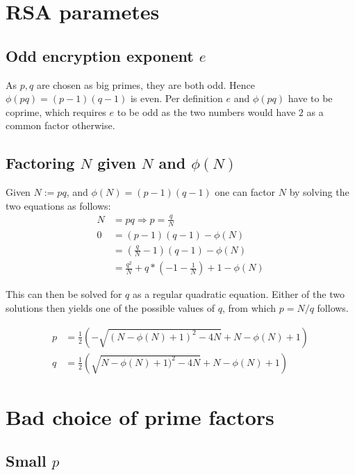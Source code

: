 \documentclass[a4paper]{scrreprt}
\begin{document}
\section{RSA parametes}

\subsection{Odd encryption exponent $e$}

As $p, q$ are chosen as big primes, they are both odd. Hence $\phi(pq) = (p -
1) (q - 1)$ is even. Per definition $e$ and $\phi(pq)$ have to be coprime,
which requires $e$ to be odd as the two numbers would have $2$ as a common
factor otherwise.

\subsection{Factoring $N$ given $N$ and $\phi(N)$}

Given $N := pq$, and $\phi(N) = (p - 1) (q - 1)$ one can factor $N$ by solving
the two equations as follows:
\begin{align*}
	N & = pq \Rightarrow p = \frac{q}{N} \\
	0 & = (p - 1) (q - 1) - \phi(N) \tag*{Per the theorem shown in the lecture} \\
	  & = (\frac{q}{N} - 1) (q - 1) - \phi(N) \tag*{Per the first equation above} \\
	  & = \frac{q^2}{N} + q*(-1 - \frac{1}{N}) + 1 - \phi(N)
\end{align*}

This can then be solved for $q$ as a regular quadratic equation. Either of the
two solutions then yields one of the possible values of $q$, from which $p = N
/ q$ follows.

\begin{align*}
	p & = \frac{1}{2} (- \sqrt{(N - \phi(N) + 1)^2 - 4N} + N - \phi(N) + 1) \\
	q & = \frac{1}{2} (\sqrt{N - \phi(N) + 1)^2 - 4N} + N - \phi(N) + 1)
\end{align*}


\section{Bad choice of prime factors}

\subsection{Small $p$}
\end{document}
